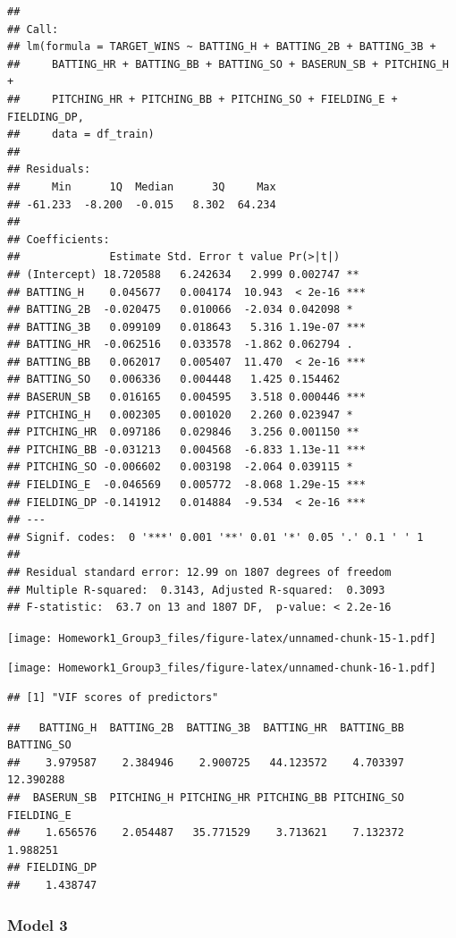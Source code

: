 \documentclass[
]{article}
\begin{document}
\begin{verbatim}
## 
## Call:
## lm(formula = TARGET_WINS ~ BATTING_H + BATTING_2B + BATTING_3B + 
##     BATTING_HR + BATTING_BB + BATTING_SO + BASERUN_SB + PITCHING_H + 
##     PITCHING_HR + PITCHING_BB + PITCHING_SO + FIELDING_E + FIELDING_DP, 
##     data = df_train)
## 
## Residuals:
##     Min      1Q  Median      3Q     Max 
## -61.233  -8.200  -0.015   8.302  64.234 
## 
## Coefficients:
##              Estimate Std. Error t value Pr(>|t|)    
## (Intercept) 18.720588   6.242634   2.999 0.002747 ** 
## BATTING_H    0.045677   0.004174  10.943  < 2e-16 ***
## BATTING_2B  -0.020475   0.010066  -2.034 0.042098 *  
## BATTING_3B   0.099109   0.018643   5.316 1.19e-07 ***
## BATTING_HR  -0.062516   0.033578  -1.862 0.062794 .  
## BATTING_BB   0.062017   0.005407  11.470  < 2e-16 ***
## BATTING_SO   0.006336   0.004448   1.425 0.154462    
## BASERUN_SB   0.016165   0.004595   3.518 0.000446 ***
## PITCHING_H   0.002305   0.001020   2.260 0.023947 *  
## PITCHING_HR  0.097186   0.029846   3.256 0.001150 ** 
## PITCHING_BB -0.031213   0.004568  -6.833 1.13e-11 ***
## PITCHING_SO -0.006602   0.003198  -2.064 0.039115 *  
## FIELDING_E  -0.046569   0.005772  -8.068 1.29e-15 ***
## FIELDING_DP -0.141912   0.014884  -9.534  < 2e-16 ***
## ---
## Signif. codes:  0 '***' 0.001 '**' 0.01 '*' 0.05 '.' 0.1 ' ' 1
## 
## Residual standard error: 12.99 on 1807 degrees of freedom
## Multiple R-squared:  0.3143, Adjusted R-squared:  0.3093 
## F-statistic:  63.7 on 13 and 1807 DF,  p-value: < 2.2e-16
\end{verbatim}

\texttt{[image: Homework1\_Group3\_files/figure-latex/unnamed-chunk-15-1.pdf]}

\texttt{[image: Homework1\_Group3\_files/figure-latex/unnamed-chunk-16-1.pdf]}

\begin{verbatim}
## [1] "VIF scores of predictors"
\end{verbatim}

\begin{verbatim}
##   BATTING_H  BATTING_2B  BATTING_3B  BATTING_HR  BATTING_BB  BATTING_SO 
##    3.979587    2.384946    2.900725   44.123572    4.703397   12.390288 
##  BASERUN_SB  PITCHING_H PITCHING_HR PITCHING_BB PITCHING_SO  FIELDING_E 
##    1.656576    2.054487   35.771529    3.713621    7.132372    1.988251 
## FIELDING_DP 
##    1.438747
\end{verbatim}

\hypertarget{model-3}{%
\subsubsection{Model 3}\label{model-3}}
\end{document}
